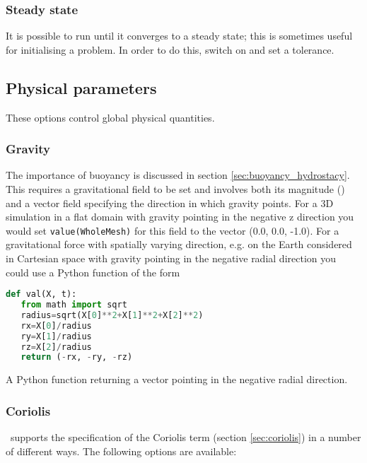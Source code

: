 \subsubsection{Steady state}
It is possible to run \fluidity until it converges to a steady state; this is sometimes useful for initialising a problem. In order to do this, switch on  and set a tolerance. 

\subsection{Physical parameters}
These options control global physical quantities.

\subsubsection{Gravity}\label{sec:Gravity}
The importance of buoyancy is discussed in section \ref{sec:buoyancy_hydrostacy}. This
requires a gravitational field to be set and involves both its magnitude
(\eg \mss[9.8]) and a vector field specifying the direction in which gravity
points. For a 3D simulation in a flat domain with gravity pointing in the
negative z direction you would set \verb+value(WholeMesh)+ for this field to
the vector (0.0, 0.0, -1.0). For a gravitational force with spatially
varying direction, e.g. on the Earth considered in Cartesian space with
gravity pointing in the negative radial direction you could use a Python
function of the form
\begin{example}
  \begin{lstlisting}[language=Python]
def val(X, t):
   from math import sqrt
   radius=sqrt(X[0]**2+X[1]**2+X[2]**2)
   rx=X[0]/radius
   ry=X[1]/radius
   rz=X[2]/radius
   return (-rx, -ry, -rz)
  \end{lstlisting}
  \caption{A Python function returning a vector pointing in the negative radial direction.}
\end{example}

\subsubsection{Coriolis}

\fluidity\ supports the specification of the Coriolis term (section
\ref{sec:coriolis}) in a number of different ways. The following options
are available:

